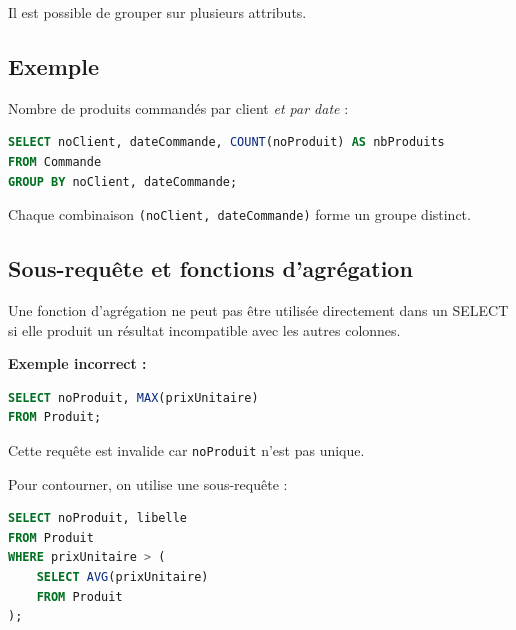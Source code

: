 Il est possible de grouper sur plusieurs attributs.

\subsection*{Exemple}

Nombre de produits commandés par client \textit{et par date} :

\begin{sqlcodebox}
\begin{lstlisting}[language=SQL]
SELECT noClient, dateCommande, COUNT(noProduit) AS nbProduits
FROM Commande
GROUP BY noClient, dateCommande;
\end{lstlisting}
\end{sqlcodebox}

Chaque combinaison \texttt{(noClient, dateCommande)} forme un groupe distinct.


\subsection{Sous-requête et fonctions d’agrégation}

Une fonction d’agrégation ne peut pas être utilisée directement dans un SELECT si elle produit un résultat incompatible avec les autres colonnes.

\textbf{Exemple incorrect :}

\begin{sqlcodebox}
\begin{lstlisting}[language=SQL]
SELECT noProduit, MAX(prixUnitaire)
FROM Produit;
\end{lstlisting}
\end{sqlcodebox}

Cette requête est invalide car \texttt{noProduit} n’est pas unique.

\medskip

Pour contourner, on utilise une sous-requête :

\begin{sqlcodebox}
\begin{lstlisting}[language=SQL]
SELECT noProduit, libelle
FROM Produit
WHERE prixUnitaire > (
    SELECT AVG(prixUnitaire)
    FROM Produit
);
\end{lstlisting}
\end{sqlcodebox}


